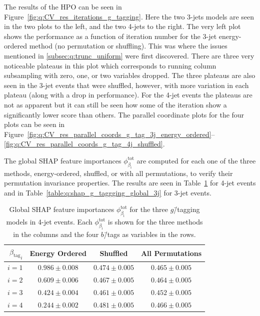 The results of the HPO can be seen in Figure~\ref{fig:q:CV_res_iterations_g_tagging}. Here the two 3-jets models are seen in the two plots to the left, and the two 4-jets to the right. The very left plot shows the performance as a function of iteration number for the 3-jet energy-ordered method (no permutation or shuffling). This was where the issues mentioned in \autoref{subsec:q:trunc_uniform} were first discovered. There are three very noticeable plateaus in this plot which corresponds to running column subsampling with zero, one, or two variables dropped. The three plateaus are also seen in the 3-jet events that were shuffled, however, with more variation in each plateau (along with a drop in performance). For the 4-jet events the plateaus are not as apparent but it can still be seen how some of the iteration show a significantly lower score than others. The parallel coordinate plots for the four plots can be seen in Figure~\ref{fig:q:CV_res_parallel_coords_g_tag_3j_energy_ordered}--\ref{fig:q:CV_res_parallel_coords_g_tag_4j_shuffled}.

The global SHAP feature importances $\phi^\mathrm{tot}_{\beta_\mathrm{i}}$ are computed for each one of the three methods, energy-ordered, shuffled, or with all permutations, to verify their permutation invariance properties. The results are seen in Table~\ref{table:q:shap_g_taggging_global_4j} for 4-jet events and in Table~\ref{table:q:shap_g_taggging_global_3j} for 3-jet events. 

\begin{table}[h!]
  \centerfloat
  \begin{tabular}{@{}rccc@{}}
  ${\beta_\mathrm{tag}}_i$  & Energy Ordered & Shuffled & All Permutations \\ \midrule
  $i=1$ & $ 0.986 \pm 0.008 $  &  $ 0.474 \pm 0.005 $  &  $ 0.465 \pm 0.005 $  \\
  $i=2$ & $ 0.609 \pm 0.006 $  &  $ 0.467 \pm 0.005 $  &  $ 0.464 \pm 0.005 $  \\
  $i=3$ & $ 0.424 \pm 0.004 $  &  $ 0.461 \pm 0.005 $  &  $ 0.452 \pm 0.005 $  \\
  $i=4$ & $ 0.244 \pm 0.002 $  &  $ 0.481 \pm 0.005 $  &  $ 0.466 \pm 0.005 $  \\ 
  \end{tabular}
  \caption[Global SHAP Feature Importances for the $g$\=/Tagging Models in 4-Jet Events]{Global SHAP feature importances $\phi^\mathrm{tot}_{\beta_\mathrm{i}}$ for the three $g$\=/tagging models in 4-jet events. Each $\phi^\mathrm{tot}_{\beta_\mathrm{i}}$ is shown for the three methods in the columns and the four $b$\=/tags as variables in the rows.}
  \label{table:q:shap_g_taggging_global_4j}
\end{table}
\vspace{2mm}


